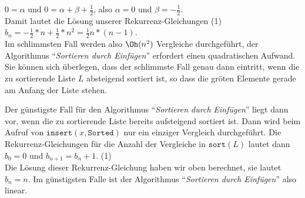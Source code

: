 \hspace*{1.3cm} $0 = \alpha$ \quad und \quad $\displaystyle 0 = \alpha + \beta + \frac{1}{2}$, \quad also \quad  $\alpha = 0$ \quad und \quad $\beta = - \frac{1}{2}$.  
\\[0.1cm]
Damit lautet die L\"osung unserer Rekurrenz-Gleichungen (1) \\[0.1cm]
\hspace*{1.3cm} 
$\displaystyle b_n = -\frac{1}{2} * n + \frac{1}{2} * n^2 = \frac{1}{2} n*(n-1)$. \\[0.1cm]
Im schlimmsten Fall werden also $\Oh(n^2)$ Vergleiche durchgef\"uhrt, der Algorithmus 
``\emph{Sortieren durch Einf\"ugen}'' erfordert einen quadratischen Aufwand.
Sie k\"onnen sich \"uberlegen, dass der schlimmste Fall genau dann eintritt, wenn die zu
sortierende Liste $L$ absteigend sortiert ist, so dass die gr\"o\3ten Elemente gerade am
Anfang der Liste stehen.

Der g\"unstigste Fall f\"ur den Algorithmus ``\emph{Sortieren durch Einf\"ugen}'' liegt dann
vor, wenn die zu sortierende Liste bereits aufsteigend sortiert ist.  Dann wird beim
Aufruf von $\mathtt{insert}(x,\mathtt{Sorted})$ nur ein einziger Vergleich durchgef\"uhrt.
Die Rekurrenz-Gleichungen f\"ur die Anzahl der Vergleiche in $\mathtt{sort}(L)$ lautet dann \\[0.1cm]
\hspace*{1.3cm} $b_0 = 0$ \quad und \quad $b_{n+1} = b_n + 1$. \hspace*{\fill} (1)\\[0.1cm]
Die L\"osung dieser Rekurrenz-Gleichung haben wir oben berechnet, sie lautet $b_n = n$.
Im g\"unstigsten Falle ist der Algorithmus ``\emph{Sortieren durch Einf\"ugen}'' also linear.
\pagebreak

